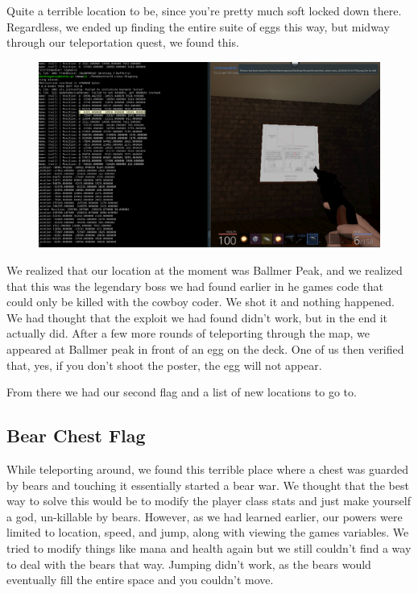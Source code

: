 \documentclass[11pt]{article}
\begin{document}
Quite a terrible location to be, since you're pretty much soft locked down there. Regardless, we ended up finding the entire suite of eggs this way, but midway through our teleportation quest, we found this. 
\begin{figure}[H]
    \centering
    \includegraphics[width=1.00\linewidth]{shoot_poster.png}
\end{figure}

We realized that our location at the moment was Ballmer Peak, and we realized that this was the legendary boss we had found earlier in he games code that could only be killed with the cowboy coder. We shot it and nothing happened. We had thought that the exploit we had found didn't work, but in the end it actually did. After a few more rounds of teleporting through the map, we appeared at Ballmer peak in front of an egg on the deck. One of us then verified that, yes, if you don't shoot the poster, the egg will not appear.

From there we had our second flag and a list of new locations to go to.

\subsection*{Bear Chest Flag}

While teleporting around, we found this terrible place where a chest was guarded by bears and touching it essentially started a bear war. We thought that the best way to solve this would be to modify the player class stats and just make yourself a god, un-killable by bears. However, as we had learned earlier, our powers were limited to location, speed, and jump, along with viewing the games variables. We tried to modify things like mana and health again but we still couldn't find a way to deal with the bears that way. Jumping didn't work, as the bears would eventually fill the entire space and you couldn't move. 
\end{document}
